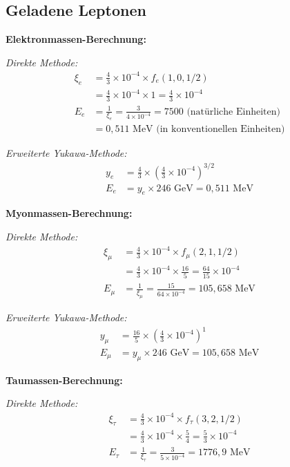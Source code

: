 \documentclass[12pt,a4paper]{article}
\begin{document}
	\subsection{Geladene Leptonen}
	\label{subsec:charged_leptons}
	
	\textbf{Elektronmassen-Berechnung:}
	
	\textit{Direkte Methode:}
	\begin{align}
		\xi_e &= \frac{4}{3} \times 10^{-4} \times f_e(1,0,1/2) \\
		&= \frac{4}{3} \times 10^{-4} \times 1 = \frac{4}{3} \times 10^{-4} \\
		E_{e} &= \frac{1}{\xi_e} = \frac{3}{4 \times 10^{-4}} = 7500 \text{ (natürliche Einheiten)} \\
		&= 0,511 \text{ MeV (in konventionellen Einheiten)}
	\end{align}
	
	\textit{Erweiterte Yukawa-Methode:}
	\begin{align}
		y_e &= \frac{4}{3} \times \left(\frac{4}{3} \times 10^{-4}\right)^{3/2} \\
		E_e &= y_e \times 246 \text{ GeV} = 0,511 \text{ MeV}
	\end{align}
	
	\textbf{Myonmassen-Berechnung:}
	
	\textit{Direkte Methode:}
	\begin{align}
		\xi_\mu &= \frac{4}{3} \times 10^{-4} \times f_\mu(2,1,1/2) \\
		&= \frac{4}{3} \times 10^{-4} \times \frac{16}{5} = \frac{64}{15} \times 10^{-4} \\
		E_{\mu} &= \frac{1}{\xi_\mu} = \frac{15}{64 \times 10^{-4}} = 105,658 \text{ MeV}
	\end{align}
	
	\textit{Erweiterte Yukawa-Methode:}
	\begin{align}
		y_\mu &= \frac{16}{5} \times \left(\frac{4}{3} \times 10^{-4}\right)^1 \\
		E_\mu &= y_\mu \times 246 \text{ GeV} = 105,658 \text{ MeV}
	\end{align}
	
	\textbf{Taumassen-Berechnung:}
	
	\textit{Direkte Methode:}
	\begin{align}
		\xi_\tau &= \frac{4}{3} \times 10^{-4} \times f_\tau(3,2,1/2) \\
		&= \frac{4}{3} \times 10^{-4} \times \frac{5}{4} = \frac{5}{3} \times 10^{-4} \\
		E_{\tau} &= \frac{1}{\xi_\tau} = \frac{3}{5 \times 10^{-4}} = 1776,9 \text{ MeV}
	\end{align}
	
\end{document}
